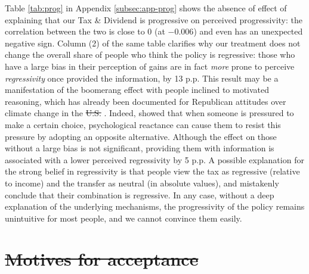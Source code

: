 \documentclass[12pt]{article} %
\providecommand{\DIFaddtex}[1]{{\protect\color{blue}\uwave{#1}}} %
\providecommand{\DIFdeltex}[1]{{\protect\color{red}\sout{#1}}}                      %
\providecommand{\DIFaddbegin}{} %
\providecommand{\DIFaddend}{} %
\providecommand{\DIFdelbegin}{} %
\providecommand{\DIFdelend}{} %
\providecommand{\DIFadd}[1]{\texorpdfstring{\DIFaddtex{#1}}{#1}} %
\providecommand{\DIFdel}[1]{\texorpdfstring{\DIFdeltex{#1}}{}} %
\newcommand{\DIFscaledelfig}{0.5}
\newlength{\DIFdelgraphicswidth} %
\newlength{\DIFdelgraphicsheight} %
\newcommand{\DIFaddincludegraphics}[2][]{{\color{blue}\fbox{\DIFOincludegraphics[#1]{#2}}}} %
\newcommand{\DIFdelincludegraphics}[2][]{%
\sbox{\DIFdelgraphicsbox}{\DIFOincludegraphics[#1]{#2}}%
\settoboxwidth{\DIFdelgraphicswidth}{\DIFdelgraphicsbox} %
\settoboxtotalheight{\DIFdelgraphicsheight}{\DIFdelgraphicsbox} %
\scalebox{\DIFscaledelfig}{%
\parbox[b]{\DIFdelgraphicswidth}{\usebox{\DIFdelgraphicsbox}\\[-\baselineskip] \rule{\DIFdelgraphicswidth}{0em}}\llap{\resizebox{\DIFdelgraphicswidth}{\DIFdelgraphicsheight}{%
\setlength{\unitlength}{\DIFdelgraphicswidth}%
\begin{picture}(1,1)%
\thicklines\linethickness{2pt} %
{\color[rgb]{1,0,0}\put(0,0){\framebox(1,1){}}}%
{\color[rgb]{1,0,0}\put(0,0){\line( 1,1){1}}}%
{\color[rgb]{1,0,0}\put(0,1){\line(1,-1){1}}}%
\end{picture}%
}\hspace*{3pt}}} %
} %
\DeclareRobustCommand{\DIFaddbegin}{\DIFOaddbegin \let\includegraphics\DIFaddincludegraphics} %
\DeclareRobustCommand{\DIFaddend}{\DIFOaddend \let\includegraphics\DIFOincludegraphics} %
\DeclareRobustCommand{\DIFdelbegin}{\DIFOdelbegin \let\includegraphics\DIFdelincludegraphics} %
\DeclareRobustCommand{\DIFdelend}{\DIFOaddend \let\includegraphics\DIFOincludegraphics} %
\begin{document}
Table \ref{tab:prog} in Appendix \ref{subsec:app-prog} shows the absence of effect of explaining that our Tax \& Dividend is progressive on perceived progressivity: the correlation between the two is close to 0 (at $-0.006$) and even has an unexpected negative sign. Column (2) of the same table clarifies why our treatment does not change the overall share of people who think the policy is regressive: those who have a large bias in their perception of gains are in fact \textit{more} prone to perceive \textit{regressivity} once provided the information, by 13 p.p. This result may be a manifestation of the boomerang effect with people inclined to motivated reasoning, which has already been documented for Republican attitudes over climate change in the \DIFdelbegin \DIFdel{U.S. }\DIFdelend \DIFaddbegin \DIFadd{US }\DIFaddend \citep{zhou_boomerangs_2016}. Indeed, \citet{hovland_communication_1953} showed that when someone is pressured to make a certain choice, psychological reactance \citep[theorized by][]{brehm_theory_1966} can cause them to resist this pressure by adopting an opposite alternative.  Although the effect on those without a large bias is not significant, providing them with information is associated with a lower perceived regressivity by 5 p.p. A possible explanation for the strong belief in regressivity is that people view the tax as regressive (relative to income) and the transfer as neutral (in absolute values), and mistakenly conclude that their combination is regressive. In any case, without a deep explanation of the underlying mechanisms, the progressivity of the policy remains unintuitive for most people, and we cannot convince them easily.





\section{\DIFdelbegin \DIFdel{Motives for acceptance }\DIFdelend \DIFaddbegin \DIFadd{How beliefs determine attitudes }\DIFaddend \label{sec:motives5}}
\end{document}
